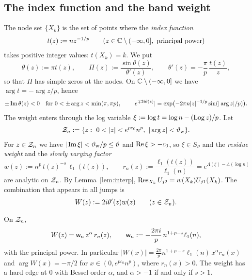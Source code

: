 \subsection{The index function and the band weight}\label{sec:frame-weight}
The node set $\{X_k\}$ is the set of points where the \emph{index function}
\begin{equation}\label{eq:t}
  t(z):=nz^{-1/p}\qquad(z\in\mathbb{C}\setminus(-\infty,0],\ \text{principal power})
\end{equation}
takes positive integer values: $t(X_k)=k$. We put
\begin{equation}\label{eq:theta}
  \theta(z):=\pi t(z),\qquad \Pi(z):=\frac{\sin\theta(z)}{\theta'(z)},\qquad \theta'(z)=-\frac{\pi}{p}\,\frac{t(z)}{z},
\end{equation}
so that $\Pi$ has simple zeros at the nodes. On $\mathbb{C}\setminus(-\infty,0]$ we have $\arg t=-\arg z/p$, hence
\begin{equation}\label{eq:imtheta}
  \pm\operatorname{Im}\theta(z)<0\quad\text{for }0<\pm\arg z<\min(\pi,\pi p),\qquad
  |e^{\mp2i\theta(z)}|=\exp\bigl(-2\pi n|z|^{-1/p}\sin(|\arg z|/p)\bigr).
\end{equation}
The weight enters through the log variable $\xi:=\log t=\log n-(\operatorname{Log} z)/p$. Let
\begin{equation}\label{eq:Zn}
  \Zn:=\{z:\ 0<|z|<e^{pc_0}n^p,\ |\arg z|<\thw\}.
\end{equation}
For $z\in\mathcal{Z}_n$ we have $|\operatorname{Im}\xi|<\vartheta_{\mathrm{w}}/p\le\vartheta$ and $\operatorname{Re}\xi>-c_0$, so $\xi\in S_\vartheta$ and the
\emph{residue weight} and the \emph{slowly varying factor}
\begin{equation}\label{eq:w-rn}
  w(z):=n^p\,t(z)^{-s}\,\ell_1(t(z)),\qquad r_n(z):=\frac{\ell_1(t(z))}{\ell_1(n)}=e^{\Lambda(\xi)-\Lambda(\log n)}
\end{equation}
are analytic on $\mathcal{Z}_n$. By Lemma~\ref{lem:interp}, $\operatorname*{Res}_{X_k}U_{j2}=w(X_k)U_{j1}(X_k)$. The combination that appears
in all jumps is
\begin{equation}\label{eq:W}
  W(z):=2i\theta'(z)w(z)\qquad(z\in\mathcal{Z}_n).
\end{equation}

\begin{lemma}\label{lem:bandweight}
On $\mathcal{Z}_n$,
\begin{equation}\label{eq:Wformula}
  W(z)=\mathsf w_n\,z^{\alpha}\,r_n(z),\qquad \mathsf w_n:=-\frac{2\pi i}{p}\,n^{1+p-s}\ell_1(n),
\end{equation}
with the principal power. In particular $|W(x)|=\frac{2\pi}{p}n^{1+p-s}\ell_1(n)\,x^\alpha r_n(x)$ and
$\arg W(x)=-\pi/2$ for $x\in(0,e^{pc_0}n^p)$, where $r_n(x)>0$. The weight has a hard edge at $0$ with Bessel order
$\alpha$, and $\alpha>-1$ if and only if $s>1$.
\end{lemma}

